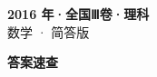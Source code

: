 \documentclass[zihao=-4, a4paper]{ctexart}
\begin{document}
\begin{center}
  {\Large\bfseries 2016 年·全国Ⅲ卷·理科}\\[4pt]
  {\large 数学 · 简答版}
\end{center}
\medskip
{}

\clearpage
{}
\begin{center}{\Large\bfseries 答案速查}\end{center}
\medskip

\end{document}
